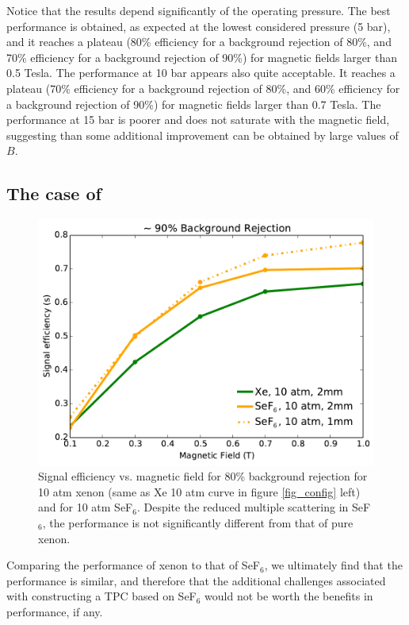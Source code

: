 \documentclass{JINST}
\begin{document}
Notice that the results depend significantly of the operating pressure. The best performance is obtained, as expected at the lowest considered pressure (5 bar), and it reaches a plateau (80\% efficiency for a background rejection of 80\%, and 70\% efficiency for a background rejection of 90\%) for magnetic fields larger than 0.5 Tesla. The performance at 10 bar appears also quite acceptable. It reaches a plateau (70\% efficiency for a background rejection of 80\%, and 60\% efficiency for a background rejection of 90\%) for magnetic fields larger than 0.7 Tesla. The performance at 15 bar is poorer and does not saturate with the magnetic field, suggesting than some additional improvement can be obtained by large values of $B$. 

\subsection{The case of \SEHF}

\begin{figure}[!htb]
	\centering
	\includegraphics[scale=0.6]{fig/eff_vs_b_xe_sef6_90.pdf}
	\caption{\label{fig_xevssef6}Signal efficiency vs. magnetic field for 80\% background rejection for 10 atm xenon (same as Xe 10 atm curve in figure \protect\ref{fig_config} left) and for 10 atm SeF$_6$.  Despite the reduced multiple scattering in SeF$_6$, the performance is not significantly different from that of pure xenon.}
\end{figure}

Comparing the performance of xenon to that of SeF$_6$, we ultimately find that the performance is similar, and
therefore that the additional challenges associated with constructing a TPC based on SeF$_6$ would not be worth
the benefits in performance, if any.
\end{document}

